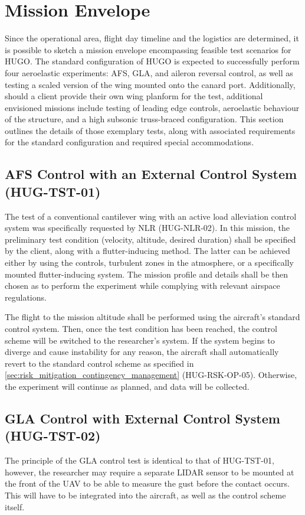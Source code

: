 \section{Mission Envelope}
\label{sec:mission_envelope}
Since the operational area, flight day timeline and the logistics are determined, it is possible to sketch a mission envelope encompassing feasible test scenarios for HUGO. The standard configuration of HUGO is expected to successfully perform four aeroelastic experiments: AFS, GLA, and aileron reversal control, as well as testing a scaled version of the wing mounted onto the canard port. Additionally, should a client provide their own wing planform for the test, additional envisioned missions include testing of leading edge controls, aeroelastic behaviour of the structure, and a high subsonic truss-braced configuration. This section outlines the details of those exemplary tests, along with associated requirements for the standard configuration and required special accommodations.


\subsection{AFS Control with an External Control System (HUG-TST-01)}
The test of a conventional cantilever wing with an active load alleviation control system was specifically requested by NLR (HUG-NLR-02). In this mission, the preliminary test condition (velocity, altitude, desired duration) shall be specified by the client, along with a flutter-inducing method. The latter can  be achieved either by using the controls, turbulent zones in the atmosphere, or a specifically mounted flutter-inducing system. The mission profile and details shall be then chosen as to perform the experiment while complying with relevant airspace regulations.

The flight to the mission altitude shall be performed using the aircraft's standard control system. Then, once the test condition has been reached, the control scheme will be switched to the researcher’s system. If the system begins to diverge and cause instability for any reason, the aircraft shall automatically revert to the standard control scheme as specified in \autoref{sec:risk_mitigation_contingency_management} (HUG-RSK-OP-05). Otherwise, the experiment will continue as planned, and data will be collected.


\subsection{GLA Control with External Control System (HUG-TST-02)}
The principle of the GLA control test is identical to that of HUG-TST-01, however, the researcher may require a separate LIDAR sensor to be mounted at the front of the UAV to be able to measure the gust before the contact occurs. This will have to be integrated into the aircraft, as well as the control scheme itself.

